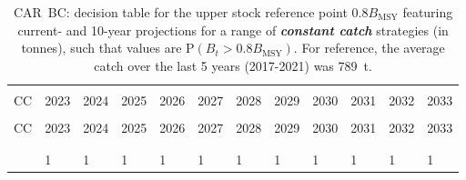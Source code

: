 \documentclass[11pt]{book}
\newcommand{\Bmsy}{B_\text{MSY}}
\newcommand{\itbf}[1]{\textit{\textbf{#1}}}
\begin{document}
\begin{longtable}[c]{>{\raggedright\let\newline\\\arraybackslash\hspace{0pt}}p{0.49in}>{\raggedleft\let\newline\\\arraybackslash\hspace{0pt}}p{0.49in}>{\raggedleft\let\newline\\\arraybackslash\hspace{0pt}}p{0.49in}>{\raggedleft\let\newline\\\arraybackslash\hspace{0pt}}p{0.49in}>{\raggedleft\let\newline\\\arraybackslash\hspace{0pt}}p{0.49in}>{\raggedleft\let\newline\\\arraybackslash\hspace{0pt}}p{0.49in}>{\raggedleft\let\newline\\\arraybackslash\hspace{0pt}}p{0.55in}>{\raggedleft\let\newline\\\arraybackslash\hspace{0pt}}p{0.55in}>{\raggedleft\let\newline\\\arraybackslash\hspace{0pt}}p{0.55in}>{\raggedleft\let\newline\\\arraybackslash\hspace{0pt}}p{0.55in}>{\raggedleft\let\newline\\\arraybackslash\hspace{0pt}}p{0.55in}>{\raggedleft\let\newline\\\arraybackslash\hspace{0pt}}p{0.55in}}
  \caption{CAR~BC: decision table for the upper stock reference point $0.8 \Bmsy$ featuring current- and 10-year projections for a range of \itbf{constant catch} strategies (in tonnes), such that values are P$(B_t > 0.8 \Bmsy)$.  For reference, the average catch over the last 5 years (2017-2021) was 789~t. } \label{tab:car.gmu.USR.CCs}\\  \hline\\[-2.2ex]  CC  & 2023 & 2024 & 2025 & 2026 & 2027 & 2028 & 2029 & 2030 & 2031 & 2032 & 2033 \\[0.2ex]\hline\\[-1.5ex]  \endfirsthead   \hline  CC  & 2023 & 2024 & 2025 & 2026 & 2027 & 2028 & 2029 & 2030 & 2031 & 2032 & 2033 \\[0.2ex]\hline\\[-1.5ex]  \endhead  \hline\\[-2.2ex]   \endfoot  \hline \endlastfoot  0 & 1 & 1 & 1 & 1 & 1 & 1 & 1 & 1 & 1 & 1 & 1 \\ 

\end{longtable}
\end{document}
